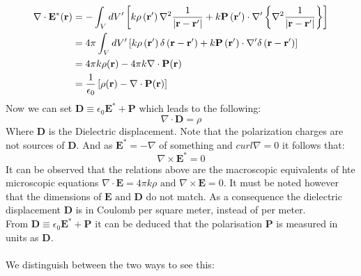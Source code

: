 \begin{equation}
    \begin{aligned}
    \nabla \cdot \mathbf{E}^{*}(\mathbf{r}) &=-\int_{V} d V^{\prime}\left[k \rho\left(\mathbf{r}^{\prime}\right) \nabla^{2} \frac{1}{\left|\mathbf{r}-\mathbf{r}^{\prime}\right|}+k \mathbf{P}\left(\mathbf{r}^{\prime}\right) \cdot \nabla^{\prime}\left\{\nabla^{2} \frac{1}{\left|\mathbf{r}-\mathbf{r}^{\prime}\right|}\right\}\right] \\
    &=4 \pi \int_{V} d V^{\prime}\left[k \rho\left(\mathbf{r}^{\prime}\right) \delta\left(\mathbf{r}-\mathbf{r}^{\prime}\right)+k \mathbf{P}\left(\mathbf{r}^{\prime}\right) \cdot \nabla^{\prime} \delta\left(\mathbf{r}-\mathbf{r}^{\prime}\right)\right] \\
    &=4\pi k \rho(\textbf{\textbf{r}})-4\pi k \nabla \cdot \textbf{P}(\textbf{r}) \\
    &=\frac{1}{\epsilon_0} \left[ \rho(\textbf{r}) - \nabla \cdot \textbf{P}(\textbf{r}) \right]
    \end{aligned}
    \end{equation}
Now we can set $\displaystyle \textbf{D} \equiv \epsilon_0 \textbf{E}^* +\textbf{P}$ which leads to the following:
\begin{equation}
    \nabla \cdot \textbf{D} = \rho
\end{equation}
Where \textbf{D} is the Dielectric displacement. Note that the polarization charges are not sources of \textbf{D}. And as $\displaystyle \textbf{E}^* = -\nabla$ of something and $curl \nabla = 0$ it follows that:
\begin{equation}
    \nabla \times \textbf{E}^* =0
\end{equation}
It can be observed that the relations above are the macroscopic equivalents of hte microscopic equations $\displaystyle \nabla \cdot \textbf{E} = 4\pi k \rho \text{ and } \nabla \times \textbf{E} = 0$. It must be noted however that the dimensions of $\textbf{E} \text{ and } \textbf{D}$ do not match. As a consequence the dielectric displacement \textbf{D} is in Coulomb per square meter, instead of per meter.\\
From  $\displaystyle \textbf{D} \equiv \epsilon_0 \textbf{E}^* +\textbf{P}$ it can be deduced that the polarisation \textbf{P} is measured in units as \textbf{D}.\\
\\
\noindent We distinguish between the two ways to see this:
